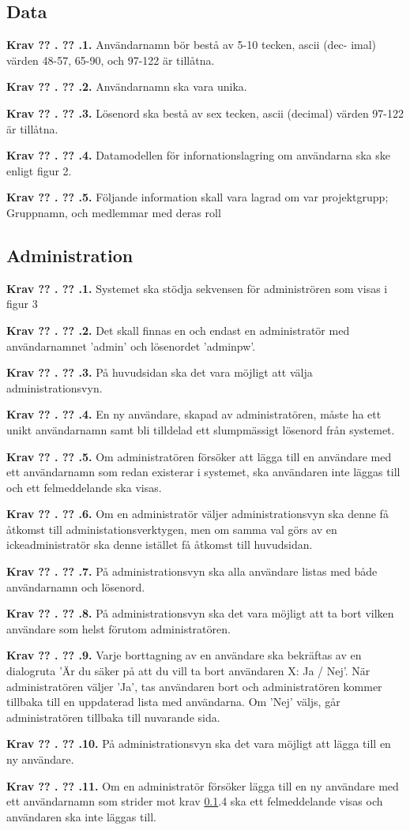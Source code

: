 \documentclass[a4paper]{article}
\newcommand\getcurrentref[1]{%
 \ifnumequal{\value{#1}}{0}
  {??}
  {\the\value{#1}}%
}
\newcommand\requirement[2]{
	\numberedrow{Krav}{#1}{#2}
}
\newcommand\numberedrow[3]{
	\noindent
	\textbf{#1 \getcurrentref{section}.\getcurrentref{subsection}.#2.} #3
	
}
\begin{document}
\subsection{Data}
\label{krav-funk-data}
\requirement{1}{Användarnamn bör bestå av 5-10 tecken, ascii (dec- imal) värden 48-57, 65-90, och 97-122 är tillåtna.}
\requirement{2}{Användarnamn ska vara unika.}
\requirement{3}{Lösenord ska bestå av sex tecken, ascii (decimal) värden 97-122 är tillåtna.}

\requirement{4}{Datamodellen för infornationslagring om användarna ska ske enligt figur 2.
}
\requirement{5}{Följande information skall vara lagrad om var projektgrupp; Gruppnamn, och medlemmar med deras roll}
\subsection{Administration}
\requirement{1}{Systemet ska stödja sekvensen för administrören som visas i figur 3}
\requirement{2}{Det skall finnas en och endast en administratör med användarnamnet 'admin' och lösenordet 'adminpw'.}
\requirement{3}{På huvudsidan ska det vara möjligt att välja administrationsvyn.}
\requirement{4}{En ny användare, skapad av administratören, måste ha ett unikt användarnamn samt bli tilldelad ett slumpmässigt lösenord från systemet.}
\requirement{5}{Om administratören försöker att lägga till en användare med ett användarnamn som redan existerar i systemet, ska användaren inte läggas till och ett felmeddelande ska visas.}
\requirement{6}{Om en administratör väljer administrationsvyn ska denne få åtkomst till administationsverktygen, men om samma val görs av en ickeadministratör ska denne istället få åtkomst till huvudsidan.}
\requirement{7}{På administrationsvyn ska alla användare listas med både användarnamn och lösenord.}
\requirement{8}{På administrationsvyn ska det vara möjligt att ta bort vilken användare som helst förutom administratören.}
\requirement{9}{Varje borttagning av en användare ska bekräftas av en dialogruta 'Är du säker på att du vill ta bort användaren X: Ja / Nej'. När administratören väljer 'Ja', tas användaren bort och administratören kommer tillbaka till en uppdaterad lista med användarna. Om 'Nej' väljs, går administratören tillbaka till nuvarande sida.}
\requirement{10}{På administrationsvyn ska det vara möjligt att lägga till en ny användare.}
\requirement{11}{Om en administratör försöker lägga till en ny användare med ett användarnamn som strider mot krav \ref{krav-funk-data}.4 ska ett felmeddelande visas och användaren ska inte läggas till.}
\end{document}
